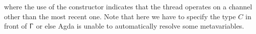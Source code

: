 \begin{AgdaAlign}
\begin{code}%
%
\>[2]%
\>[11]\AgdaSymbol{:}\AgdaSpace{}%
\AgdaSpace{}%
\AgdaSpace{}%
\AgdaSpace{}%
\AgdaSymbol{\}}\AgdaSpace{}%
\AgdaSymbol{(}\AgdaSpace{}%
\AgdaSymbol{:}\AgdaSpace{}%
\AgdaSpace{}%
\AgdaSpace{}%
\AgdaOperator{\AgdaFunction{[}}\AgdaSpace{}%
\AgdaSpace{}%
\AgdaOperator{\AgdaFunction{]}}\AgdaSpace{}%
\AgdaOperator{\AgdaDatatype{+}}\AgdaSpace{}%
\AgdaSymbol{)}\AgdaSpace{}%
\AgdaSpace{}%
\AgdaSpace{}%
\AgdaSymbol{(}\AgdaSpace{}%
\AgdaSymbol{(}\AgdaSpace{}%
\AgdaSpace{}%
\AgdaOperator{\AgdaInductiveConstructor{>\AgdaUnderscore{}}}\AgdaSpace{}%
\AgdaSymbol{\{}\AgdaSymbol{\}}\AgdaSpace{}%
\AgdaSpace{}%
\AgdaSpace{}%
\AgdaSymbol{))}\<%
\end{code}
where the use of the constructor \AgdaInductiveConstructor{>} indicates that the
thread operates on a channel other than the most recent one. Note that here we
have to specify the type $C$ in front of $\Upgamma$ or else Agda is unable to
automatically resolve some metavariables.


\end{AgdaAlign}
